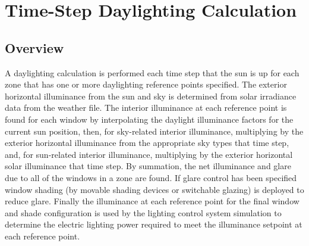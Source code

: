 \section{Time-Step Daylighting Calculation}\label{time-step-daylighting-calculation}

\subsection{Overview}\label{overview-027}

A daylighting calculation is performed each time step that the sun is up for each zone that has one or more daylighting reference points specified.
The exterior horizontal illuminance from the sun and sky is determined from solar irradiance data from the weather file.
The interior illuminance at each reference point is found for each window by interpolating the daylight illuminance factors for the current sun position, then,
for sky-related interior illuminance, multiplying by the exterior horizontal illuminance from the appropriate sky types that time step, and,
for sun-related interior illuminance, multiplying by the exterior horizontal solar illuminance that time step.
By summation, the net illuminance and glare due to all of the windows in a zone are found.
If glare control has been specified window shading (by movable shading devices or switchable glazing) is deployed to reduce glare.
Finally the illuminance at each reference point for the final window and shade configuration is used by the lighting control system simulation
to determine the electric lighting power required to meet the illuminance setpoint at each reference point.


